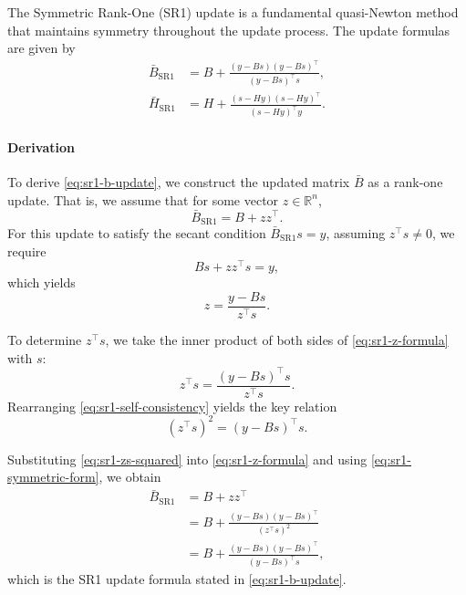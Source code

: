 \documentclass[0_en]{subfiles}
\begin{document}
The Symmetric Rank-One (SR1) update \citep{nocedal1999numerical} is a fundamental quasi-Newton method that maintains symmetry throughout the update process. The update formulas are given by
\begin{align}
    \bar{B}_{\mathrm{SR1}} & = B + \frac{(y - B s)(y - B s)^\top}{(y - B s)^\top s}, \label{eq:sr1-b-update} \\
    \bar{H}_{\mathrm{SR1}} & = H + \frac{(s - H y)(s - H y)^\top}{(s - H y)^\top y}. \label{eq:sr1-h-update}
\end{align}

\paragraph{Derivation}

To derive \cref{eq:sr1-b-update}, we construct the updated matrix $\bar{B}$ as a rank-one update. That is, we assume that for some vector $z \in \mathbb{R}^n$,
\begin{equation}\label{eq:sr1-symmetric-form}
    \bar{B}_{\mathrm{SR1}} = B + z z^\top.
\end{equation}
For this update to satisfy the secant condition $\bar{B}_{\mathrm{SR1}} s = y$, assuming $z^\top s \neq 0$, we require
\begin{equation}\label{eq:sr1-secant-condition}
    B s + z z^\top s = y,
\end{equation}
which yields
\begin{equation}\label{eq:sr1-z-formula}
    z = \frac{y - B s}{z^\top s}.
\end{equation}

To determine $z^\top s$, we take the inner product of both sides of \cref{eq:sr1-z-formula} with $s$:
\begin{equation}\label{eq:sr1-self-consistency}
    z^\top s = \frac{(y - B s)^\top s}{z^\top s}.
\end{equation}
Rearranging \cref{eq:sr1-self-consistency} yields the key relation
\begin{equation}\label{eq:sr1-zs-squared}
    (z^\top s)^2 = (y - B s)^\top s.
\end{equation}

Substituting \cref{eq:sr1-zs-squared} into \cref{eq:sr1-z-formula} and using \cref{eq:sr1-symmetric-form}, we obtain
\begin{align}\label{eq:sr1-derivation-final}
    \bar{B}_{\mathrm{SR1}}
     & = B + z z^\top                                          \\
     & = B + \frac{(y - B s)(y - B s)^\top}{(z^\top s)^2}      \\
     & = B + \frac{(y - B s)(y - B s)^\top}{(y - B s)^\top s},
\end{align}
which is the SR1 update formula stated in \cref{eq:sr1-b-update}.
\end{document}
